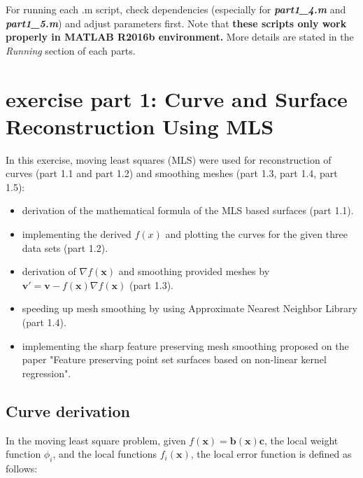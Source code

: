 \documentclass[paper=a4, fontsize=11pt]{scrartcl} %
\numberwithin{equation}{section} %
\numberwithin{figure}{section} %
\numberwithin{table}{section} %
\newcommand{\filename}[1]{\textbf{\textit{#1}}}
\renewcommand{\vec}[1]{\mathbf{#1}}
\begin{document}
For running each .m script, check dependencies (especially for \filename{part1\_4.m} and \filename{part1\_5.m}) and adjust parameters first. Note that \textbf{these scripts only work properly in MATLAB R2016b environment.} More details are stated in the \textit{Running} section of each parts.


\section{exercise part 1: Curve and Surface Reconstruction Using MLS}

In this exercise, moving least squares (MLS) were used for reconstruction of curves (part 1.1 and part 1.2) and smoothing meshes (part 1.3, part 1.4, part 1.5): 

\begin{itemize}
\item derivation of the mathematical formula of the MLS based surfaces (part 1.1).
\item implementing the derived $f(x)$ and plotting the curves for the given three data sets (part 1.2). 
\item derivation of $\nabla f(\vec{x})$ and smoothing provided meshes by $\vec{v'} = \vec{v} - f(\vec{x}) \nabla f(\vec{x})$ (part 1.3). 
\item speeding up mesh smoothing by using Approximate Nearest Neighbor Library (part 1.4). 
\item implementing the sharp feature preserving mesh smoothing proposed on the paper "Feature preserving point set surfaces based on non-linear kernel regression".
\end{itemize}  


\subsection{Curve derivation}

In the moving least square problem, given $f(\vec{x}) = \vec{b}(\vec{x})\vec{c}$, the local weight function $\phi_i$, and the local functions $f_i(\vec{x})$, the local error function is defined as follows:
\end{document}

